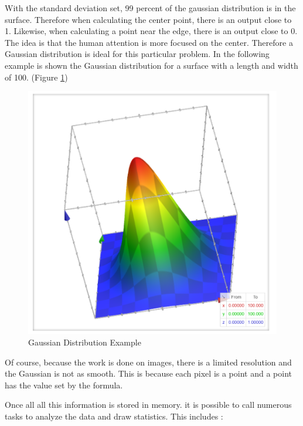 \documentclass[a4paper,11pt]{report}
\numberwithin{figure}{section} %
\begin{document}
    With the standard deviation set, 99 percent of the gaussian distribution is in the surface.
    Therefore when calculating the center point, there is an output close to 1.
    Likewise, when calculating a point near the edge, there is an output close to 0.
    The idea is that the human attention is more focused on the center.
    Therefore a Gaussian distribution is ideal for this particular problem.
    In the following example is shown the Gaussian distribution for a surface with a length and width of 100. (Figure \ref{fig:gaus22})

    \begin{figure}[H]
      \centering
      \includegraphics[width=.45\linewidth]{gaussian2D.png}
      \caption{Gaussian Distribution Example}
      \label{fig:gaus22}
    \end{figure}

    Of course, because the work is done on images, there is a limited resolution and the Gaussian is not as smooth.
    This is because each pixel is a point and a point has the value set by the formula.
    \newline

    Once all all this information is stored in memory.
    it is possible to call numerous tasks to analyze the data and draw statistics.
    This includes :
\end{document}
